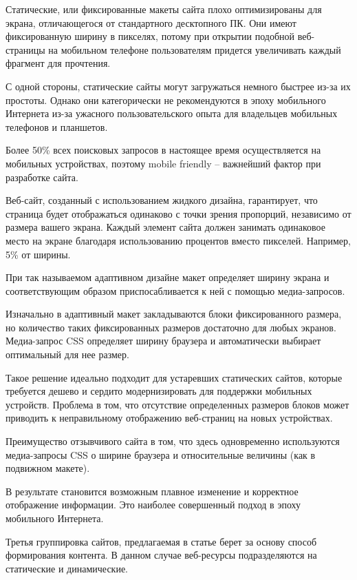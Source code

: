 Статические, или фиксированные макеты сайта плохо оптимизированы для экрана, отличающегося от стандартного десктопного ПК.
Они имеют фиксированную ширину в пикселях, потому при открытии подобной веб-страницы на мобильном телефоне пользователям придется увеличивать каждый фрагмент для прочтения.

С одной стороны, статические сайты могут загружаться немного быстрее из-за их простоты. Однако они категорически не рекомендуются в эпоху мобильного Интернета из-за ужасного пользовательского опыта для владельцев мобильных телефонов и планшетов.

Более 50\% всех поисковых запросов в настоящее время осуществляется на мобильных устройствах, поэтому mobile friendly – важнейший фактор при разработке сайта.

Веб-сайт, созданный с использованием жидкого дизайна, гарантирует, что страница будет отображаться одинаково с точки зрения пропорций, независимо от размера вашего экрана.
Каждый элемент сайта должен занимать одинаковое место на экране благодаря использованию процентов вместо пикселей.
Например, 5\% от ширины.

При так называемом адаптивном дизайне макет определяет ширину экрана и соответствующим образом приспосабливается к ней с помощью медиа-запросов.

Изначально в адаптивный макет закладываются блоки фиксированного размера, но количество таких фиксированных размеров достаточно для любых экранов.
Медиа-запрос CSS определяет ширину браузера и автоматически выбирает оптимальный для нее размер.

Такое решение идеально подходит для устаревших статических сайтов, которые требуется дешево и сердито модернизировать для поддержки мобильных устройств.
Проблема в том, что отсутствие определенных размеров блоков может приводить к неправильному отображению веб-страниц на новых устройствах.

Преимущество отзывчивого сайта в том, что здесь одновременно используются медиа-запросы CSS о ширине браузера и относительные величины (как в подвижном макете).

В результате становится возможным плавное изменение и корректное отображение информации.
Это наиболее совершенный подход в эпоху мобильного Интернета.

Третья группировка сайтов, предлагаемая в статье \cite{denisov} берет за основу способ формирования контента.
В данном случае веб-ресурсы подразделяются на статические и динамические.

